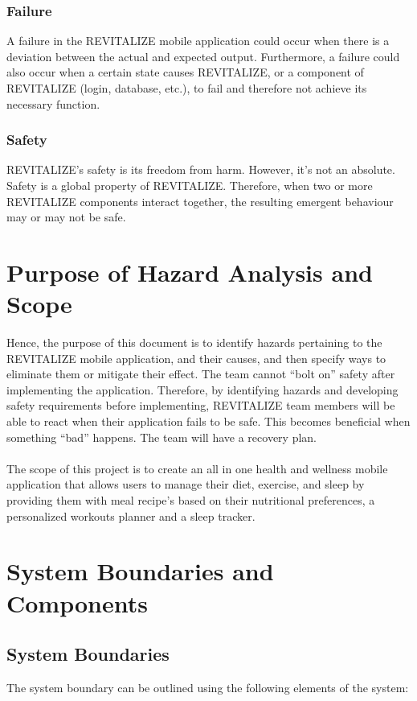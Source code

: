 \documentclass{article}
\begin{document}
\subsubsection{Failure}
A failure in the REVITALIZE mobile application could occur when there is a deviation between the actual and expected output. Furthermore, a failure could also occur when a certain state causes REVITALIZE, or a component of REVITALIZE (login, database, etc.), to fail and therefore not achieve its necessary function.

\subsubsection{Safety}
REVITALIZE's safety is its freedom from harm. However, it's not an absolute. Safety is a global property of REVITALIZE. Therefore, when two or more REVITALIZE components interact together, the resulting emergent behaviour may or may not be safe.

\section{Purpose of Hazard Analysis and Scope}
Hence, the purpose of this document is to identify hazards pertaining to the REVITALIZE mobile application, and their causes, and then specify ways to eliminate them or mitigate their effect. The team cannot “bolt on” safety after implementing the application. Therefore, by identifying hazards and developing safety requirements before implementing, REVITALIZE team members will be able to react when their application fails to be safe. This becomes beneficial when something “bad” happens. The team will have a recovery plan.
\\\\ The scope of this project is to create an all in one health and wellness mobile application that allows users to manage their diet, exercise, and sleep by providing them with meal recipe’s based on their nutritional preferences, a personalized workouts planner and a sleep tracker.

\section{System Boundaries and Components}

\subsection{System Boundaries}
\noindent The system boundary can be outlined using the following elements of the system: 
\end{document}
